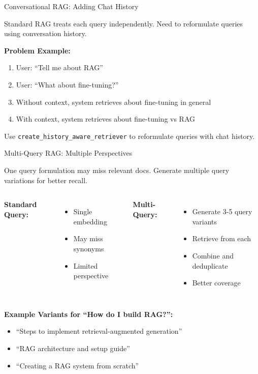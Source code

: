 \documentclass[aspectratio=169,11pt]{beamer}
\begin{document}
\begin{frame}{Conversational RAG: Adding Chat History}
  \begin{warningbox}[Challenge]
    Standard RAG treats each query independently. Need to reformulate queries using conversation history.
  \end{warningbox}

  \textbf{Problem Example:}
  \begin{enumerate}
    \setlength{\itemsep}{0pt}
    \item User: ``Tell me about RAG''
    \item User: ``What about fine-tuning?''
    \item Without context, system retrieves about fine-tuning in general
    \item With context, system retrieves about fine-tuning vs RAG
  \end{enumerate}

  \begin{tipbox}[Solution]
    Use \texttt{create\_history\_aware\_retriever} to reformulate queries with chat history.
  \end{tipbox}
\end{frame}

\begin{frame}{Multi-Query RAG: Multiple Perspectives}
  \begin{conceptbox}[Intuition]
    One query formulation may miss relevant docs. Generate multiple query variations for better recall.
  \end{conceptbox}

  \begin{columns}[T]
    \textbf{Standard Query:}
    \begin{itemize}
    \setlength{\itemsep}{1pt}
      \item Single embedding
      \item May miss synonyms
      \item Limited perspective
    \end{itemize}

    \textbf{Multi-Query:}
    \begin{itemize}
    \setlength{\itemsep}{1pt}
      \item Generate 3-5 query variants
      \item Retrieve from each
      \item Combine and deduplicate
      \item Better coverage
    \end{itemize}
  \end{columns}

  \textbf{Example Variants for ``How do I build RAG?'':}
  \begin{itemize}
    \setlength{\itemsep}{1pt}
    \item ``Steps to implement retrieval-augmented generation''
    \item ``RAG architecture and setup guide''
    \item ``Creating a RAG system from scratch''
  \end{itemize}
\end{frame}
\end{document}
